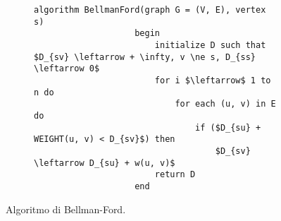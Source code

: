 \documentclass{subfiles}
\begin{document}
\begin{figure}[!h]
    \centering
    \begin{subfigure}[b]{0.75\textwidth}
        \begin{lstlisting}[language = algol]
                algorithm BellmanFord(graph G = (V, E), vertex s)
                    begin
                        initialize D such that $D_{sv} \leftarrow + \infty, v \ne s, D_{ss} \leftarrow 0$ 
                        for i $\leftarrow$ 1 to n do
                            for each (u, v) in E do
                                if ($D_{su} + WEIGHT(u, v) < D_{sv}$) then 
                                    $D_{sv} \leftarrow D_{su} + w(u, v)$
                        return D
                    end
            \end{lstlisting}
    \end{subfigure}
    \caption{Algoritmo di Bellman-Ford.}
    \label{Fig:6.5}
\end{figure}
\end{document}
